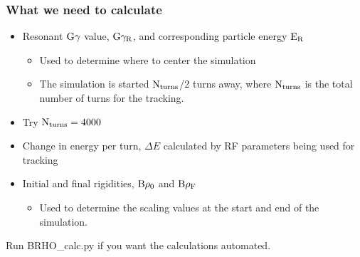 \documentclass{beamer}
\begin{document}
\begin{frame}
\frametitle{What we need to calculate}

\begin{itemize}
\item Resonant $\rm G\gamma$ value, $\rm G\gamma_R$, and corresponding particle energy $\rm E_R$
\begin{itemize}
\item Used to determine where to center the simulation
\item The simulation is started $\rm N_{turns}$/2 turns away, where $\rm N_{turns}$ is the total number of turns for the tracking. 
\end{itemize}
\item Try $\rm N_{turns}=4000$
\item Change in energy per turn, $\Delta E$ calculated by RF parameters being used for tracking
\item Initial and final rigidities, $\rm B\rho_0$ and $\rm B\rho_F$
\begin{itemize}
\item Used to determine the scaling values at the start and end of the simulation.
\end{itemize}
\end{itemize}
Run BRHO_calc.py if you want the calculations automated.
\end{frame}
\end{document}
